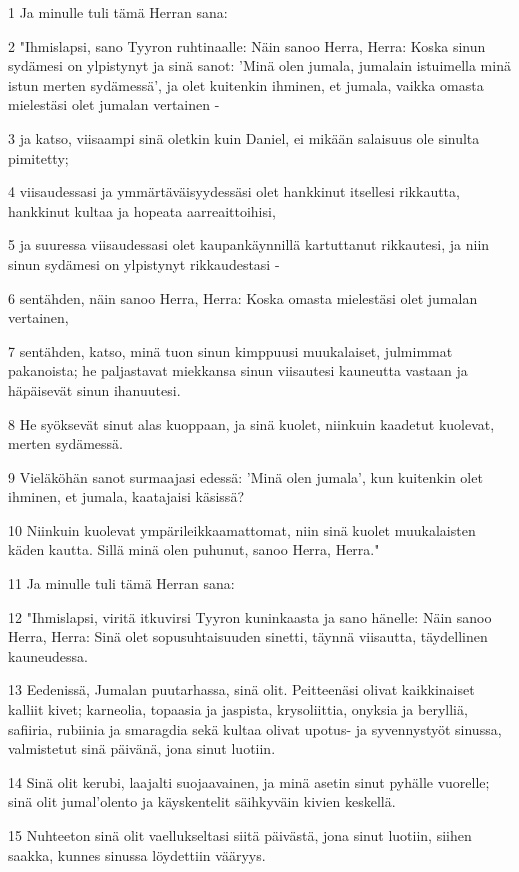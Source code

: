 \par 1 Ja minulle tuli tämä Herran sana:
\par 2 "Ihmislapsi, sano Tyyron ruhtinaalle: Näin sanoo Herra, Herra: Koska sinun sydämesi on ylpistynyt ja sinä sanot: 'Minä olen jumala, jumalain istuimella minä istun merten sydämessä', ja olet kuitenkin ihminen, et jumala, vaikka omasta mielestäsi olet jumalan vertainen -
\par 3 ja katso, viisaampi sinä oletkin kuin Daniel, ei mikään salaisuus ole sinulta pimitetty;
\par 4 viisaudessasi ja ymmärtäväisyydessäsi olet hankkinut itsellesi rikkautta, hankkinut kultaa ja hopeata aarreaittoihisi,
\par 5 ja suuressa viisaudessasi olet kaupankäynnillä kartuttanut rikkautesi, ja niin sinun sydämesi on ylpistynyt rikkaudestasi -
\par 6 sentähden, näin sanoo Herra, Herra: Koska omasta mielestäsi olet jumalan vertainen,
\par 7 sentähden, katso, minä tuon sinun kimppuusi muukalaiset, julmimmat pakanoista; he paljastavat miekkansa sinun viisautesi kauneutta vastaan ja häpäisevät sinun ihanuutesi.
\par 8 He syöksevät sinut alas kuoppaan, ja sinä kuolet, niinkuin kaadetut kuolevat, merten sydämessä.
\par 9 Vieläköhän sanot surmaajasi edessä: 'Minä olen jumala', kun kuitenkin olet ihminen, et jumala, kaatajaisi käsissä?
\par 10 Niinkuin kuolevat ympärileikkaamattomat, niin sinä kuolet muukalaisten käden kautta. Sillä minä olen puhunut, sanoo Herra, Herra."
\par 11 Ja minulle tuli tämä Herran sana:
\par 12 "Ihmislapsi, viritä itkuvirsi Tyyron kuninkaasta ja sano hänelle: Näin sanoo Herra, Herra: Sinä olet sopusuhtaisuuden sinetti, täynnä viisautta, täydellinen kauneudessa.
\par 13 Eedenissä, Jumalan puutarhassa, sinä olit. Peitteenäsi olivat kaikkinaiset kalliit kivet; karneolia, topaasia ja jaspista, krysoliittia, onyksia ja berylliä, safiiria, rubiinia ja smaragdia sekä kultaa olivat upotus- ja syvennystyöt sinussa, valmistetut sinä päivänä, jona sinut luotiin.
\par 14 Sinä olit kerubi, laajalti suojaavainen, ja minä asetin sinut pyhälle vuorelle; sinä olit jumal'olento ja käyskentelit säihkyväin kivien keskellä.
\par 15 Nuhteeton sinä olit vaellukseltasi siitä päivästä, jona sinut luotiin, siihen saakka, kunnes sinussa löydettiin vääryys.
